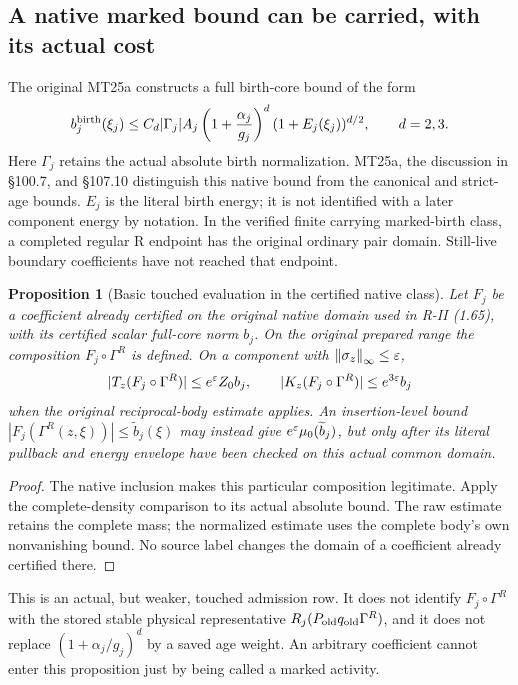 \documentclass[11pt,letterpaper]{article}
\theoremstyle{plain}
\newtheorem{proposition}[theorem]{Proposition}
\theoremstyle{remark}\newtheorem{remark}[theorem]{Scope}
\newcommand{\norm}[1]{\left\lVert#1\right\rVert}
\begin{document}
\subsection{A native marked bound can be carried, with its actual cost}

The original MT25a constructs a full birth-core bound of the form
\begin{equation}
b_j^{\rm birth}(\xi_j)\le C_d|\Gamma_j|A_j
\left(1+\frac{\alpha_j}{g_j}\right)^d(1+E_j(\xi_j))^{d/2},
\qquad d=2,3.
\label{eq:nativebirth}
\end{equation}
Here $\Gamma_j$ retains the actual absolute birth normalization. MT25a,
the discussion in \S100.7, and \S107.10 distinguish this native bound from
the canonical and strict-age bounds. $E_j$ is the literal birth energy; it
is not identified with a later component energy by notation. In the verified finite carrying
marked-birth class, a completed regular R endpoint has the original ordinary
pair domain. Still-live boundary coefficients have not reached that endpoint.

\begin{proposition}[Basic touched evaluation in the certified native class]
Let $F_j$ be a coefficient already certified on the original native domain
used in R-II (1.65), with its certified scalar full-core norm $b_j$. On the original
prepared range the composition $F_j\circ\Gamma^R$ is defined. On a component
with $\norm{\sigma_z}_\infty\le\eps$,
\begin{equation}
|T_z(F_j\circ\Gamma^R)|\le e^\varepsilon Z_0b_j,\qquad
|K_z(F_j\circ\Gamma^R)|\le e^{3\varepsilon}b_j
\label{eq:nativecarry}
\end{equation}
when the original reciprocal-body estimate applies. An insertion-level bound
$|F_j(\Gamma^R(z,\xi))|\le\widetilde b_j(\xi)$ may instead give
$e^\varepsilon\mu_0(\widetilde b_j)$, but only after its literal pullback and energy
envelope have been checked on this actual common domain.
\end{proposition}
\begin{proof}
The native inclusion makes this particular composition legitimate. Apply the
complete-density comparison to its actual absolute bound. The raw estimate
retains the complete mass; the normalized estimate uses the complete body's
own nonvanishing bound. No source label changes the domain of a coefficient
already certified there.
\end{proof}

This is an actual, but weaker, touched admission row. It does not identify
$F_j\circ\Gamma^R$ with the stored stable physical representative
$R_j(P_{\rm old}q_{\rm old}\Gamma^R)$, and it does not replace
$(1+\alpha_j/g_j)^d$ by a saved age weight. An arbitrary coefficient cannot
enter this proposition just by being called a marked activity.
\end{document}
